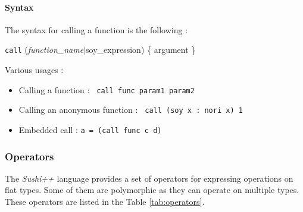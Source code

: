\documentclass[a4paper,11pt]{article}
\begin{document}
\paragraph{Syntax} The syntax for calling a function is the following :
\begin{center}
	\texttt{call} (\textit{function\_name}$|$soy\_expression) \{ argument \}
\end{center}
Various usages :
\begin{itemize}
	\item Calling a function : \texttt{ call func param1 param2 }
	\item Calling an anonymous function : \texttt{ call (soy x : nori x) 1 }
	\item Embedded call : \texttt{a = (call func c d) }
\end{itemize}
\subsubsection{Operators}
The \textit{Sushi++} language provides a set of operators for expressing operations on flat types. Some of them are polymorphic as they can operate on multiple types. These operators are listed in the Table \ref{tab:operators}.
\end{document}
